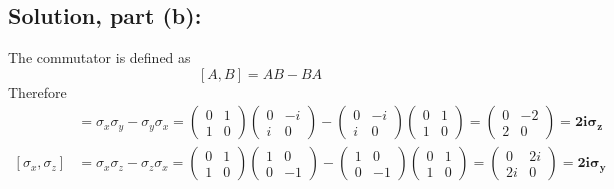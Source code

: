 \documentclass[12pt]{article}
\begin{document}
    \subsection{Solution, part (b):}
        The commutator is defined as
        \[
            [A,B] = AB - BA
        \]
        Therefore
        \begin{align*}
            [\sigma_x, \sigma_y] &= \sigma_x \sigma_y - \sigma_y \sigma_x = \begin{pmatrix} 0 & 1 \\ 1 & 0 \end{pmatrix} \begin{pmatrix} 0 & -i \\ i & 0 \end{pmatrix} - \begin{pmatrix} 0 & -i \\ i & 0 \end{pmatrix} \begin{pmatrix} 0 & 1 \\ 1 & 0 \end{pmatrix} = \begin{pmatrix} 0 & -2 \\ 2 & 0 \end{pmatrix} = \boldsymbol{\boxed{2i \sigma_z}} \\
        
            [\sigma_x, \sigma_z] &= \sigma_x \sigma_z - \sigma_z \sigma_x = \begin{pmatrix} 0 & 1 \\ 1 & 0 \end{pmatrix} \begin{pmatrix} 1 & 0 \\ 0 & -1 \end{pmatrix} - \begin{pmatrix} 1 & 0 \\ 0 & -1 \end{pmatrix} \begin{pmatrix} 0 & 1 \\ 1 & 0 \end{pmatrix} = \begin{pmatrix} 0 & 2i \\ 2i & 0 \end{pmatrix} = \boldsymbol{\boxed{2i \sigma_y}} \\
            

\end{align*}
\end{document}
